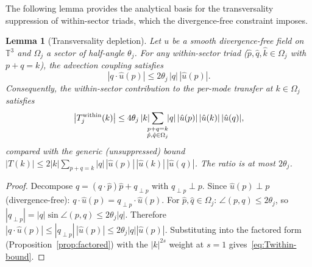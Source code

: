\documentclass[11pt]{article}
\newtheorem{lemma}[theorem]{Lemma}
\theoremstyle{definition}
\newcommand{\T}{\mathbb{T}}
\begin{document}
The following lemma provides the analytical basis
for the transversality suppression of within-sector
triads, which the divergence-free constraint imposes.

\begin{lemma}[Transversality depletion]
\label{lem:transversality}
Let $u$ be a smooth divergence-free field on $\T^3$
and $\Omega_j$ a sector of half-angle $\theta_j$.
For any within-sector triad ($\hat p, \hat q,
\hat k\in\Omega_j$ with $p+q=k$), the advection
coupling satisfies
\begin{equation}\label{eq:transversality}
|q\cdot\hat u(p)| \leq
2\theta_j\,|q|\,|\hat u(p)|.
\end{equation}
Consequently, the within-sector contribution to
the per-mode transfer at $k\in\Omega_j$ satisfies
\begin{equation}\label{eq:Twithin-bound}
\bigl|T_j^{\rm within}(k)\bigr|
\leq 4\theta_j\,|k|\!\!\!
\sum_{\substack{p+q=k\\\hat p,\hat q\in\Omega_j}}
\!\!|q|\,|\hat u(p)|\,|\hat u(k)|\,|\hat u(q)|,
\end{equation}
compared with the generic (unsuppressed) bound
$|T(k)| \leq 2|k|\sum_{p+q=k}
|q|\,|\hat u(p)|\,|\hat u(k)|\,|\hat u(q)|$.
The ratio is at most $2\theta_j$.
\end{lemma}

\begin{proof}
Decompose $q = (q\cdot\hat p)\hat p + q_{\perp p}$
with $q_{\perp p}\perp p$.  Since $\hat u(p)\perp p$
(divergence-free):
$q\cdot\hat u(p) = q_{\perp p}\cdot\hat u(p)$.
For $\hat p,\hat q\in\Omega_j$:
$\angle(p,q)\leq 2\theta_j$, so
$|q_{\perp p}| = |q|\sin\angle(p,q)
\leq 2\theta_j|q|$.
Therefore
$|q\cdot\hat u(p)| \leq |q_{\perp p}|\,|\hat u(p)|
\leq 2\theta_j|q||\hat u(p)|$.
Substituting into the factored form
(Proposition~\ref{prop:factored}) with the
$|k|^{2s}$ weight at $s=1$ gives~\eqref{eq:Twithin-bound}.
\end{proof}
\end{document}

